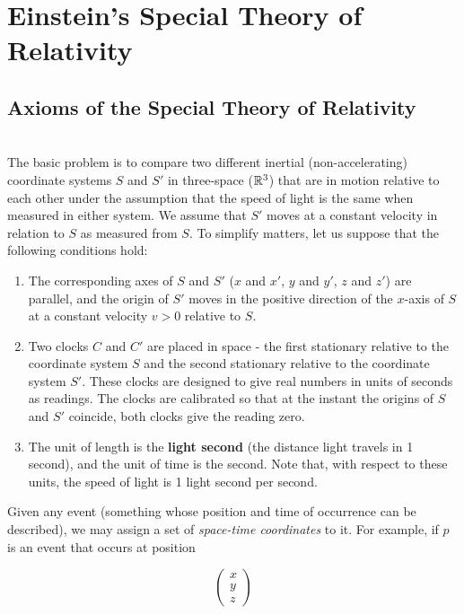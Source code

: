 \section{Einstein's Special Theory of Relativity}

\subsection*{Axioms of the Special Theory of Relativity}

\begin{definition}
	\hfill\\
	The basic problem is to compare two different inertial (non-accelerating) coordinate systems $S$ and $S'$ in three-space ($\mathbb{R}^3$) that are in motion relative to each other under the assumption that the speed of light is the same when measured in either system. We assume that $S'$ moves at a constant velocity in relation to $S$ as measured from $S$. To simplify matters, let us suppose that the following conditions hold:

	\begin{enumerate}
		\item The corresponding axes of $S$ and $S'$ ($x$ and $x'$, $y$ and $y'$, $z$ and $z'$) are parallel, and the origin of $S'$ moves in the positive direction of the $x$-axis of $S$ at a constant velocity $v > 0$ relative to $S$.
		\item Two clocks $C$ and $C'$ are placed in space - the first stationary relative to the coordinate system $S$ and the second stationary relative to the coordinate system $S'$. These clocks are designed to give real numbers in units of seconds as readings. The clocks are calibrated so that at the instant the origins of $S$ and $S'$ coincide, both clocks give the reading zero.
		\item The unit of length is the \textbf{light second} (the distance light travels in 1 second), and the unit of time is the second. Note that, with respect to these units, the speed of light is 1 light second per second.
	\end{enumerate}

	Given any event (something whose position and time of occurrence can be described), we may assign a set of \textit{space-time coordinates} to it. For example, if $p$ is an event that occurs at position

	\[\begin{pmatrix} x \\ y \\ z \end{pmatrix}\]


\end{definition}
